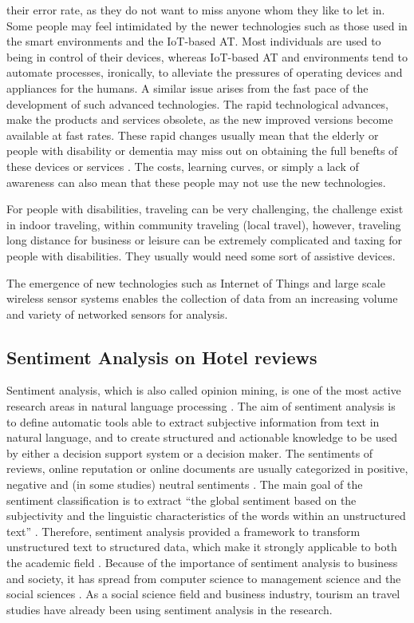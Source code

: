 their error rate, as they do not want to miss anyone whom they like to let in. Some people may feel intimidated by the newer technologies such as those used
in the smart environments and the IoT-based AT. Most individuals are used to being
in control of their devices, whereas IoT-based AT and environments tend to automate processes, ironically, to alleviate the pressures of operating devices and appliances for the humans. A similar issue arises from the fast pace of the development
of such advanced technologies. The rapid technological advances, make the products and services obsolete, as the new improved versions become available at fast
rates. These rapid changes usually mean that the elderly or people with disability or dementia may miss out on obtaining the full benefts of these devices or services .
The costs, learning curves, or simply a lack of awareness can also mean that these
people may not use the new technologies. 


For people with disabilities, traveling can be very challenging, the challenge exist in indoor traveling, within community traveling (local travel), however, traveling long distance for business or leisure can be extremely complicated and taxing for people with disabilities. They usually would need some sort of assistive devices.

The emergence of new technologies such as Internet of Things 
and large scale wireless sensor systems enables the collection of data from 
an increasing volume and variety of networked sensors for analysis.

\subsection{Sentiment Analysis on Hotel reviews}
Sentiment analysis, which is also called opinion mining, is one of the most active
research areas in natural language processing \cite{opinion2014}. The aim of sentiment analysis is to define automatic tools able to extract subjective information from text in natural \cite{article} language, and to create structured and actionable knowledge to be used by either a decision support system or a decision maker. The sentiments of reviews, online reputation or online documents are usually categorized in positive, negative and (in some studies) neutral sentiments \cite{Garcia2012}. The main goal of the sentiment classification is to extract ``the global sentiment based on the subjectivity and the linguistic characteristics of the words within an unstructured text'' \cite{Garcia2012}. Therefore, sentiment analysis provided a framework to transform unstructured text to structured data, which make it strongly applicable to both the academic field \cite{Cam2013}. Because of the importance of sentiment analysis to business and society, it has spread from computer science to management science and the social sciences \cite{Pozzi}. As a social science field and business industry, tourism an travel studies have already been using sentiment analysis in the research.

